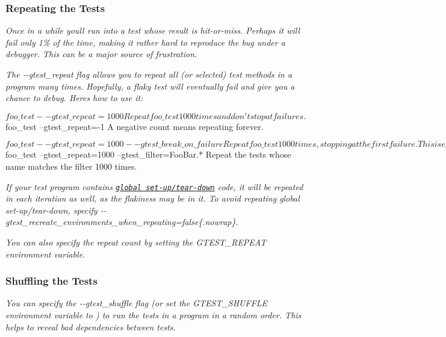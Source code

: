 {\itshape \subsubsection*{Repeating the Tests}}

{\itshape }

{\itshape Once in a while you\textquotesingle{}ll run into a test whose result is hit-\/or-\/miss. Perhaps it will fail only 1\% of the time, making it rather hard to reproduce the bug under a debugger. This can be a major source of frustration.}

{\itshape The {\ttfamily -\/-\/gtest\+\_\+repeat} flag allows you to repeat all (or selected) test methods in a program many times. Hopefully, a flaky test will eventually fail and give you a chance to debug. Here\textquotesingle{}s how to use it\+:}

{\itshape 
\begin{DoxyCode}
$ foo\_test --gtest\_repeat=1000
Repeat foo\_test 1000 times and don't stop at failures.

$ foo\_test --gtest\_repeat=-1
A negative count means repeating forever.

$ foo\_test --gtest\_repeat=1000 --gtest\_break\_on\_failure
Repeat foo\_test 1000 times, stopping at the first failure.  This
is especially useful when running under a debugger: when the test
fails, it will drop into the debugger and you can then inspect
variables and stacks.

$ foo\_test --gtest\_repeat=1000 --gtest\_filter=FooBar.*
Repeat the tests whose name matches the filter 1000 times.
\end{DoxyCode}
}

{\itshape If your test program contains \href{#global-set-up-and-tear-down}{\tt global set-\/up/tear-\/down} code, it will be repeated in each iteration as well, as the flakiness may be in it. To avoid repeating global set-\/up/tear-\/down, specify {\ttfamily -\/-\/gtest\+\_\+recreate\+\_\+environments\+\_\+when\+\_\+repeating=false}\{.nowrap\}.}

{\itshape You can also specify the repeat count by setting the {\ttfamily G\+T\+E\+S\+T\+\_\+\+R\+E\+P\+E\+AT} environment variable.}

{\itshape \subsubsection*{Shuffling the Tests}}

{\itshape }

{\itshape You can specify the {\ttfamily -\/-\/gtest\+\_\+shuffle} flag (or set the {\ttfamily G\+T\+E\+S\+T\+\_\+\+S\+H\+U\+F\+F\+LE} environment variable to {}) to run the tests in a program in a random order. This helps to reveal bad dependencies between tests.}

